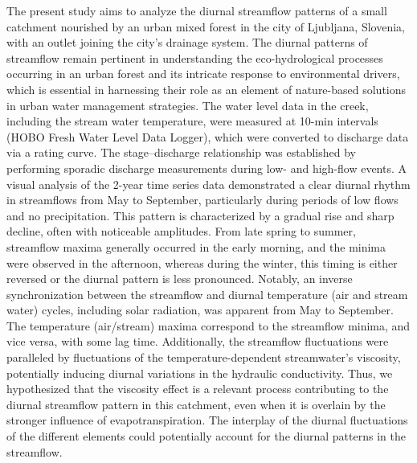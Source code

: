 The present study aims to analyze the diurnal streamflow patterns of a small catchment nourished by an urban mixed forest in the city of Ljubljana, Slovenia, with an outlet joining the city’s drainage system. The diurnal patterns of streamflow remain pertinent in understanding the eco-hydrological processes occurring in an urban forest and its intricate response to environmental drivers, which is essential in harnessing their role as an element of nature-based solutions in urban water management strategies. The water level data in the creek, including the stream water temperature, were measured at 10-min intervals (HOBO Fresh Water Level Data Logger), which were converted to discharge data via a rating curve. The stage–discharge relationship was established by performing sporadic discharge measurements during low- and high-flow events. A visual analysis of the 2-year time series data demonstrated a clear diurnal rhythm in streamflows from May to September, particularly during periods of low flows and no precipitation. This pattern is characterized by a gradual rise and sharp decline, often with noticeable amplitudes. From late spring to summer, streamflow maxima generally occurred in the early morning, and the minima were observed in the afternoon, whereas during the winter, this timing is either reversed or the diurnal pattern is less pronounced. Notably, an inverse synchronization between the streamflow and diurnal temperature (air and stream water) cycles, including solar radiation, was apparent from May to September. The temperature (air/stream) maxima correspond to the streamflow minima, and vice versa, with some lag time. Additionally, the streamflow fluctuations were paralleled by fluctuations of the temperature-dependent streamwater’s viscosity, potentially inducing diurnal variations in the hydraulic conductivity. Thus, we hypothesized that the viscosity effect is a relevant process contributing to the diurnal streamflow pattern in this catchment, even when it is overlain by the stronger influence of evapotranspiration. The interplay of the diurnal fluctuations of the different elements could potentially account for the diurnal patterns in the streamflow.

